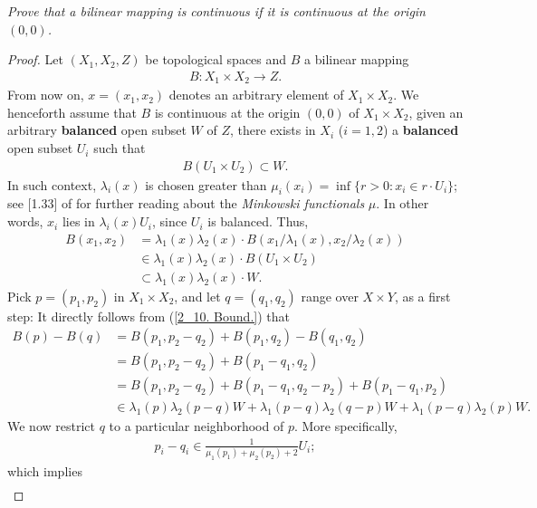\textit{%
Prove that a bilinear mapping is continuous %
if it is continuous at the origin $(0, 0)$.
}
\begin{proof}
Let $(X_1, X_2, Z)$ be topological spaces %
and $B$ a bilinear mapping %
%
\begin{align}
  B: X_1 \times X_2 \to Z. 
\end{align}
%
From now on, $x=(x_1, x_2)$ denotes an arbitrary element of %
%
  $X_1\times X_2$. %
%
We henceforth assume that $B$ is continuous at the origin %
%
  $(0, 0)$ of $X_1\times X_2$, \ie  %
%
given an arbitrary \textbf{balanced} open subset $W$ of $Z$, %
there exists in $X_i$ ($i=1, 2$) a \textbf{balanced} open subset $U_i$ %
such that %
%
\begin{align}
  B(U_1 \times U_2) \subset W .
\end{align}
%
In such context, %
%
  $\lambda_i(x) $ is chosen greater than %
  $\mu_i(x_i)=\inf\{r > 0: x_i \in r \cdot U_i\}$; %
%
see [1.33] of \cite{FA} for further reading about the %
\textit{Minkowski functionals} $\mu$. %
%
In other words, $x_i$ lies in $\lambda_i(x) U_i$, since $U_i$ is balanced. %
%
Thus, %
%
\begin{align}
  B(x_1, x_2) 
    & = 
      \lambda_1(x)\lambda_2(x) \cdot B(
        x_1/ \lambda_1(x), 
        x_2/ \lambda_2(x)) \\
    & \in 
  \lambda_1(x) \lambda_2(x) \cdot B(U_1 \times U_2) \\
    & \subset 
  \lambda_1(x) \lambda_2(x) \cdot W. \label{2_10. Bound.}
\end{align}
%
Pick $p=(p_1, p_2)$ in $X_1\times X_2$,  %
and let $ q=(q_1, q_2)$ range over $X \times Y$, as a first step: %
It directly follows from (\ref{2_10. Bound.}) that %
%
\begin{align}
  B(p) - B(q) &= B(p_1, p_2 - q_2) + B(p_1, q_2) - B(q_1, q_2)\\
  &= B(p_1, p_2 - q_2) + B(p_1-q_1, q_2)  \\
  &= B(p_1, p_2 - q_2) + B(p_1 -q_1, q_2 -p_2) + B(p_1-q_1,p_2) \\
  &\in  
     \lambda_1(p)   \lambda_2(p-q) W + 
     \lambda_1(p-q) \lambda_2(q-p) W + 
     \lambda_1(p-q) \lambda_2(p)   W.\label{2.10. In multiple of W.}
\end{align}
%
We now restrict $q$ to a particular neighborhood of $p$. %
More specifically, 
%
\begin{align}
  p_i - q_i \in \frac{1}{\mu_1(p_1) + \mu_2(p_2) + 2} U_i; 
\end{align}
%
which implies %
%
\begin{align}

\end{align}
\end{proof}
